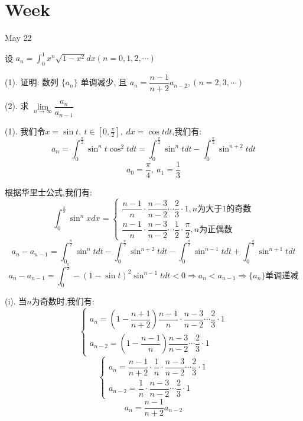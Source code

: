 \section{Week }
\textcolor{purplea}{May 22}

\begin{example}[][Exam: 31.4.1]
	设 $a_{n}=\int_{0}^{1}x^{n}\sqrt{1-x^2}dx(n=0,1,2,\cdots)$

(1). 证明: 数列 $\{a_{n}\}$ 单调减少, 且 $a_{n}=\dfrac{n-1}{n+2}a_{n-2},(n=2,3,\cdots)$

(2). 求 $\lim\limits_{n\to \infty}\dfrac{a_{n}}{a_{n-1}}$
\end{example}

\begin{solution}
	
	(1).
	我们令$x=\sin t,\ t\in[0,\frac{\pi}{2}],\ dx=\cos tdt$,我们有: 
	$$a_{n}=\int_{0}^{\frac{\pi}{2}}\sin^{n}t\cos^{2} tdt=\int_{0}^{\frac{\pi}{2}}\sin^{n}tdt-\int_{0}^{\frac{\pi}{2}}\sin^{n+2}tdt$$
	$$a_{0}=\frac{\pi}{4},\ a_{1}=\frac{1}{3}$$
	
	根据华里士公式,我们有: 
	$$\int_{0}^{\frac{\pi}{2}}\sin^{n}xdx=\left\lbrace 
	\begin{array}{l}
		\dfrac{n-1}{n}\cdot\dfrac{n-3}{n-2}\cdots\dfrac{2}{3}\cdot 1,n\text{为大于1的奇数}\\
		\dfrac{n-1}{n}\cdot\dfrac{n-3}{n-2}\cdots\dfrac{1}{2}\cdot\dfrac{\pi}{2},n\text{为正偶数}
	\end{array}
	\right. $$
	$$a_{n}-a_{n-1}=\int_{0}^{\frac{\pi}{2}}\sin^{n}tdt-\int_{0}^{\frac{\pi}{2}}\sin^{n+2}tdt-\int_{0}^{\frac{\pi}{2}}\sin^{n-1}tdt+\int_{0}^{\frac{\pi}{2}}\sin^{n+1}tdt$$
	$$a_{n}-a_{n-1}=\int_{0}^{\frac{\pi}{2}}-(1-\sin t)^2\sin^{n-1}tdt<0\Rightarrow a_{n}<a_{n-1}\Rightarrow \{a_{n}\}\text{单调递减}$$
	
	(i). 当$n$为奇数时,我们有: 
	$$\left\lbrace 
	\begin{array}{l}
		a_{n}=(1-\dfrac{n+1}{n+2})\dfrac{n-1}{n}\cdot\dfrac{n-3}{n-2}\cdots\dfrac{2}{3}\cdot 1\\
		a_{n-2}=(1-\dfrac{n-1}{n})\dfrac{n-3}{n-2}\cdots\dfrac{2}{3}\cdot 1
	\end{array}
	\right. $$
	$$\left\lbrace 
	\begin{array}{l}
		a_{n}=\dfrac{n-1}{n+2}\cdot\dfrac{1}{n}\cdot\dfrac{n-3}{n-2}\cdots\dfrac{2}{3}\cdot 1\\
		a_{n-2}=\dfrac{1}{n}\cdot\dfrac{n-3}{n-2}\cdots\dfrac{2}{3}\cdot 1
	\end{array}
	\right. 
	$$
	$$a_{n}=\dfrac{n-1}{n+2}a_{n-2}$$
	

\end{solution}
